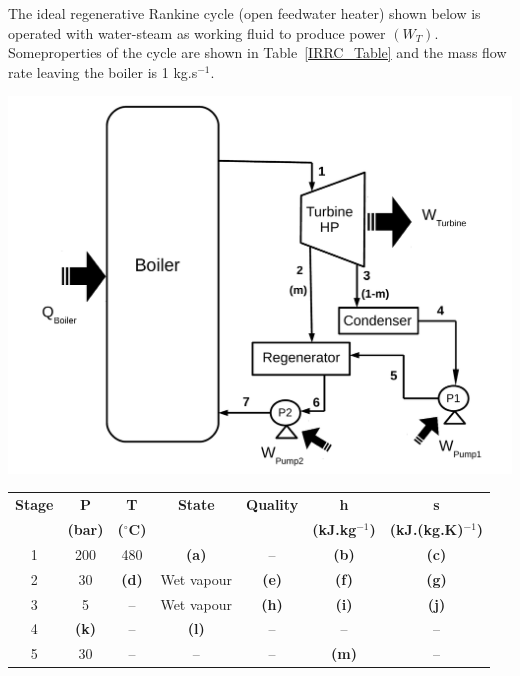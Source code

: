 \documentclass[calculator,steamtables,refrigeranttables,psychrometricchart,datasheet,solutions,resit]{exam}
\begin{document}
\begin{question}
The ideal regenerative Rankine cycle (open feedwater heater) shown below is operated with water-steam as working fluid to produce power $\left(W_{T}\right)$. Someproperties of the cycle are shown in Table~\ref{IRRC_Table} and the mass flow rate leaving the boiler is 1 kg.s$^{-1}$.
      \begin{center}
      \includegraphics[width=10.cm,clip]{./Pics/Exam_Reheat_Regenerative2_Rankine_Cycle}
     \end{center} 
\begin{table}[b]
\begin{center}
\begin{tabular}{c | c c c c c c} 
\hline
{\bf Stage} & {\bf P}       & {\bf T}            &  {\bf State}  &  {\bf Quality}  & {\bf h}             & {\bf s}                  \\
            & {\bf (bar)}   & {\bf ($^{\circ}$C)} &               &                 &{\bf (kJ.kg$^{-1}$)}  & {\bf (kJ.(kg.K)$^{-1}$)}  \\
\hline
1           &  200          & 480                &  {\bf (a)}    &   --            & {\bf (b)}           & {\bf (c)}                 \\
2           &  30           & {\bf (d)}          &  Wet vapour   & {\bf (e)}       & {\bf (f)}           & {\bf (g)}                \\
3           &  5            & --                 &  Wet vapour   & {\bf (h)}       & {\bf (i)}           & {\bf (j)}                \\
4           &  {\bf (k)}    &  --                &  {\bf (l)}    & --              &   --                &   --                      \\
5           &  30           &  --                &   --          &  --             & {\bf (m)}           &  --                       \\

\end{tabular}
\end{center}
\end{table}
\end{question}
\end{document}
